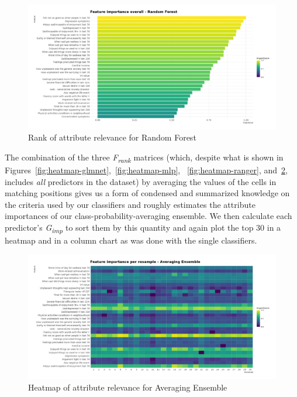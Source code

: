 \begin{figure}[H]
    \caption{Rank of attribute relevance for Random Forest}
    \centerline{\includegraphics[scale=.21]{../reports/results/models_and_evals/summary/var_imp_ranger.png}}
    \label{fig:rank-ranger}
\end{figure}

\pagebreak

The combination of the three \textit{F\textsubscript{rank}} matrices (which, despite what is shown in Figures~\ref{fig:heatmap-glmnet},~\ref{fig:heatmap-mlp}, ~\ref{fig:heatmap-ranger}, and~\ref{fig:heatmap-ensemble}, includes \textit{all} predictors in the dataset) by averaging the values of the cells in matching positions gives us a form of condensed and summarized knowledge on the criteria used by our classifiers and roughly estimates the attribute importances of our class-probability-averaging ensemble.
We then calculate each predictor's \textit{G\textsubscript{imp}} to sort them by this quantity and again plot the top 30 in a heatmap and in a column chart as was done with the single classifiers.

\begin{figure}[H]
    \caption{Heatmap of attribute relevance for Averaging Ensemble}
    \centerline{\includegraphics[scale=.22]{../reports/results/models_and_evals/summary/var_imp_resample_aggregation.png}}
    \label{fig:heatmap-ensemble}
\end{figure}

